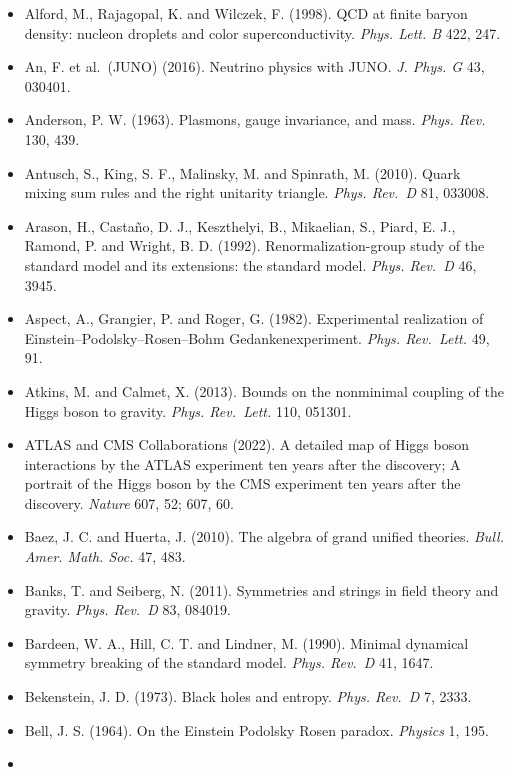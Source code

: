 \documentclass[
  11pt,
]{article}
\begin{document}
\begin{itemize}
  Alford, M., Braby, M., Paris, M. and Reddy, S. (2005). Hybrid stars that masquerade as neutron stars. \emph{Astrophys. J.} 629, 969.
\item
  Alford, M., Rajagopal, K. and Wilczek, F. (1998). QCD at finite baryon density: nucleon droplets and color superconductivity. \emph{Phys. Lett. B} 422, 247.
\item
  An, F. et al.~(JUNO) (2016). Neutrino physics with JUNO. \emph{J. Phys. G} 43, 030401.
\item
  Anderson, P. W. (1963). Plasmons, gauge invariance, and mass. \emph{Phys. Rev.} 130, 439.
\item
  Antusch, S., King, S. F., Malinsky, M. and Spinrath, M. (2010). Quark mixing sum rules and the right unitarity triangle. \emph{Phys. Rev.~D} 81, 033008.
\item
  Arason, H., Castaño, D. J., Keszthelyi, B., Mikaelian, S., Piard, E. J., Ramond, P. and Wright, B. D. (1992). Renormalization-group study of the standard model and its extensions: the standard model. \emph{Phys. Rev.~D} 46, 3945.
\item
  Aspect, A., Grangier, P. and Roger, G. (1982). Experimental realization of Einstein--Podolsky--Rosen--Bohm Gedankenexperiment. \emph{Phys. Rev.~Lett.} 49, 91.
\item
  Atkins, M. and Calmet, X. (2013). Bounds on the nonminimal coupling of the Higgs boson to gravity. \emph{Phys. Rev.~Lett.} 110, 051301.
\item
  ATLAS and CMS Collaborations (2022). A detailed map of Higgs boson interactions by the ATLAS experiment ten years after the discovery; A portrait of the Higgs boson by the CMS experiment ten years after the discovery. \emph{Nature} 607, 52; 607, 60.
\item
  Baez, J. C. and Huerta, J. (2010). The algebra of grand unified theories. \emph{Bull. Amer. Math. Soc.} 47, 483.
\item
  Banks, T. and Seiberg, N. (2011). Symmetries and strings in field theory and gravity. \emph{Phys. Rev.~D} 83, 084019.
\item
  Bardeen, W. A., Hill, C. T. and Lindner, M. (1990). Minimal dynamical symmetry breaking of the standard model. \emph{Phys. Rev.~D} 41, 1647.
\item
  Bekenstein, J. D. (1973). Black holes and entropy. \emph{Phys. Rev.~D} 7, 2333.
\item
  Bell, J. S. (1964). On the Einstein Podolsky Rosen paradox. \emph{Physics} 1, 195.
\item

\end{itemize}
\end{document}
